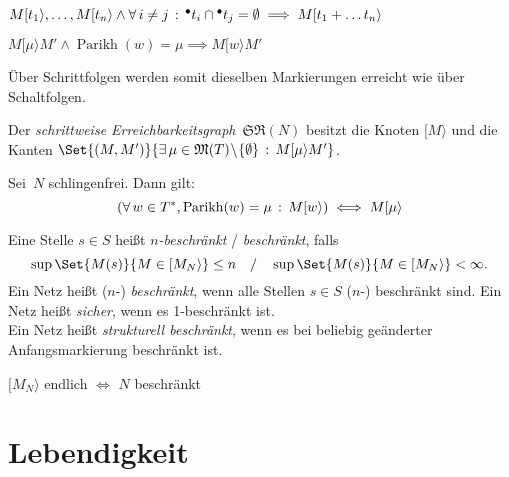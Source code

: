 \documentclass{cheat-sheet}
\newcommand{\preset}[1]{{}^\bullet{#1}} %
\newcommand{\activeTransition}[1]{[{#1}\rangle} %
\newcommand{\StepReachabilityGraph}{\mathfrak{SR}} %
\DeclareMathOperator{\Parikh}{Parikh} %
\newcommand{\Markings}{\mathfrak{M}} %
\begin{document}
\begin{lem}
  $M \activeTransition{t_1}, \ldots, M \activeTransition{t_n} \wedge \fa{i \neq j} \preset{t_i} \cap \preset{t_j} = \emptyset \implies M \activeTransition{t_1 + \ldots t_n}$
\end{lem}

\begin{lem}
  $M \activeTransition{\mu} M' \wedge \Parikh(w) = \mu \implies M \activeTransition{w} M'$
\end{lem}

\begin{bem}
  Über Schrittfolgen werden somit dieselben Markierungen erreicht wie über Schaltfolgen.
\end{bem}

\begin{defn}
  Der \emph{schrittweise Erreichbarkeitsgraph}~$\StepReachabilityGraph(N)$ besitzt die Knoten $\activeTransition{M}$ und die Kanten $\Set{(M, M')}{\ex{\mu \in \Markings(T) \!\setminus\! \{ \emptyset \}} M \activeTransition{\mu} M'}$.
\end{defn}

\begin{lem}
  Sei~$N$ schlingenfrei. Dann gilt:
  \[
    (\fa{w \in T^{*}, \Parikh(w) = \mu} M \activeTransition{w}) \iff M \activeTransition{\mu}
  \]
\end{lem}



\begin{defn}
  Eine Stelle $s \in S$ heißt \emph{$n$-beschränkt} / \emph{beschränkt}, falls
  \[
    \sup \Set{M(s)}{M \in \activeTransition{M_N}} \leq n
    \quad / \quad
    \sup \Set{M(s)}{M \in \activeTransition{M_N}} < \infty.
  \]
  Ein Netz heißt ($n$-) \textit{beschränkt}, wenn alle Stellen $s \in S$ ($n$-) beschränkt sind.
  Ein Netz heißt \emph{sicher}, wenn es 1-beschränkt ist. \\
  Ein Netz heißt \emph{strukturell beschränkt}, wenn es bei beliebig geänderter Anfangsmarkierung beschränkt ist.
\end{defn}

\begin{prop}
  $\activeTransition{M_N}$ endlich $\iff$ $N$ beschränkt
\end{prop}


\section{Lebendigkeit}
\end{document}
